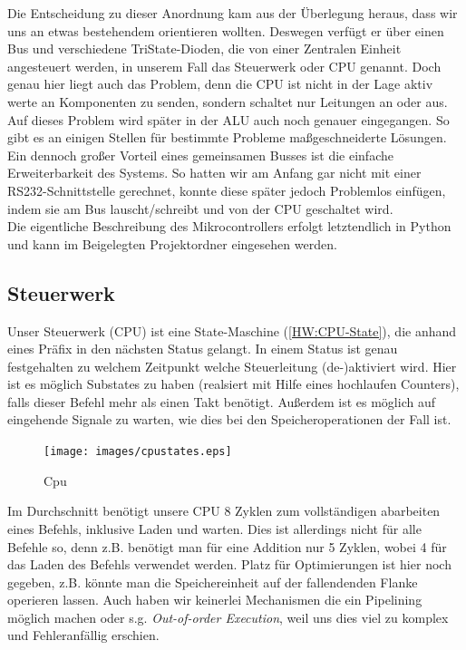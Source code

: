 Die Entscheidung zu dieser Anordnung kam aus der Überlegung heraus, dass wir uns an etwas bestehendem orientieren wollten. Deswegen verfügt er über einen Bus und verschiedene TriState-Dioden, die von einer Zentralen Einheit angesteuert werden, in unserem Fall das Steuerwerk oder CPU genannt. Doch genau hier liegt auch das Problem, denn die CPU ist nicht in der Lage aktiv werte an Komponenten zu senden, sondern schaltet nur Leitungen an oder aus. Auf dieses Problem wird später in der ALU auch noch genauer eingegangen. So gibt es an einigen Stellen für bestimmte Probleme maßgeschneiderte Lösungen.\\
Ein dennoch großer Vorteil eines gemeinsamen Busses ist die einfache Erweiterbarkeit des Systems. So hatten wir am Anfang gar nicht mit einer RS232-Schnittstelle gerechnet, konnte diese später jedoch Problemlos einfügen, indem sie am Bus lauscht/schreibt und von der CPU geschaltet wird.\\
Die eigentliche Beschreibung des Mikrocontrollers erfolgt letztendlich in Python und kann im Beigelegten Projektordner eingesehen werden.

\subsection{Steuerwerk}
Unser Steuerwerk (CPU) ist eine State-Maschine (\autoref{HW:CPU-State}), die anhand eines Präfix in den nächsten Status gelangt. In einem Status ist genau festgehalten zu welchem Zeitpunkt welche Steuerleitung (de-)aktiviert wird. Hier ist es möglich Substates zu haben (realsiert mit Hilfe eines hochlaufen Counters), falls dieser Befehl mehr als einen Takt benötigt. Außerdem ist es möglich auf eingehende Signale zu warten, wie dies bei den Speicheroperationen der Fall ist. 

\begin{figure}[h]
\centering
\texttt{[image: images/cpustates.eps]}
\caption{\label{HW:CPU-State}Cpu}
\end{figure}

Im Durchschnitt benötigt unsere CPU 8 Zyklen zum vollständigen abarbeiten eines Befehls, inklusive Laden und warten. Dies ist allerdings nicht für alle Befehle so, denn z.B. benötigt man für eine Addition nur 5 Zyklen, wobei 4 für das Laden des Befehls verwendet werden. Platz für Optimierungen ist hier noch gegeben, z.B. könnte man die Speichereinheit auf der fallendenden Flanke operieren lassen. Auch haben wir keinerlei Mechanismen die ein Pipelining möglich machen oder s.g. \emph{Out-of-order Execution}, weil uns dies viel zu komplex und Fehleranfällig erschien.


